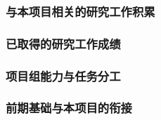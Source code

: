 \justifying
\NSFCBodyText

\subsubsection{与本项目相关的研究工作积累}

\subsubsection{已取得的研究工作成绩}

\subsubsection{项目组能力与任务分工}

\subsubsection{前期基础与本项目的衔接}
